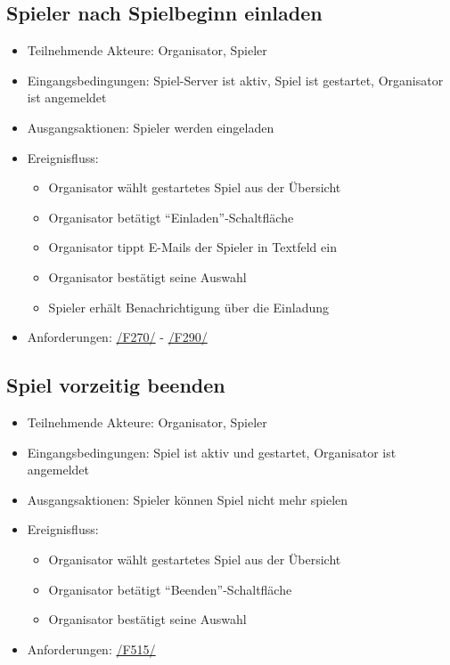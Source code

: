 \documentclass[a4paper]{scrreprt}
\begin{document}
    \subsection{Spieler nach Spielbeginn einladen}
    \begin{itemize}
        \item Teilnehmende Akteure: \Gls{Organisator}, \Gls{Spieler}
        \item Eingangsbedingungen: \Gls{Spiel-Server} ist aktiv, \Gls{Spiel} ist gestartet, \Gls{Organisator} ist angemeldet
        \item Ausgangsaktionen: \Gls{Spieler} werden eingeladen
        \item Ereignisfluss:
        \begin{itemize}
            \item \Gls{Organisator} wählt gestartetes \Gls{Spiel} aus der Übersicht
            \item \Gls{Organisator} betätigt \enquote{Einladen}-Schaltfläche
            \item \Gls{Organisator} tippt E-Mails der \Gls{Spieler} in Textfeld ein
            \item \Gls{Organisator} bestätigt seine Auswahl
            \item \Gls{Spieler} erhält Benachrichtigung über die Einladung
        \end{itemize}
        \item Anforderungen: \hyperlink{F270}{/F270/} - \hyperlink{F290}{/F290/} 
    \end{itemize}

    \subsection{Spiel vorzeitig beenden}
    \begin{itemize}
        \item Teilnehmende Akteure: \Gls{Organisator}, \Gls{Spieler}
        \item Eingangsbedingungen: \Gls{Spiel} ist aktiv und gestartet, \Gls{Organisator} ist angemeldet
        \item Ausgangsaktionen: \Gls{Spieler} können \Gls{Spiel} nicht mehr spielen %
        \item Ereignisfluss:
        \begin{itemize}
            \item \Gls{Organisator} wählt gestartetes \Gls{Spiel} aus der Übersicht
            \item \Gls{Organisator} betätigt \enquote{Beenden}-Schaltfläche
            \item \Gls{Organisator} bestätigt seine Auswahl
        \end{itemize}
        \item Anforderungen: \hyperlink{F515}{/F515/}
    \end{itemize}
\end{document}
